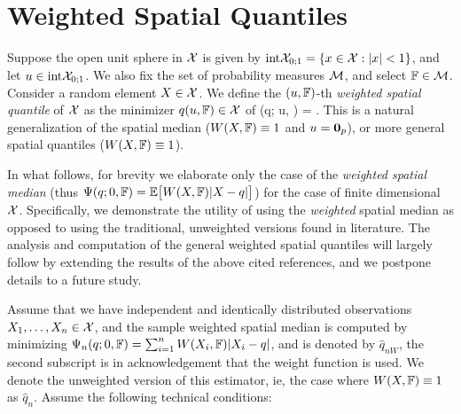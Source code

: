 \section{Weighted Spatial Quantiles}
\label{Sec:WSQuantiles}

Suppose the open unit sphere in $\mathcal{X}$ is given by 
$\textrm{int} {\mathcal{X}}_{0; 1} = \{ x \in \mathcal{X}: | x | < 1 \}$, and let
 $u \in \textrm{int} {\mathcal{X}}_{0; 1}$. We also fix the set of probability measures $\mathcal{M}$, 
 and select ${\mathbb{F}} \in \mathcal{M}$. Consider a random element $X \in \mathcal{X}$. 
We define the $(u, {\mathbb{F}})$-th \textit{weighted spatial quantile} of $\mathcal{X}$ 
as the minimizer $q (u, {\mathbb{F}}) \in \mathcal{X}$ of 
\baq
\Psi (q; u, \BF) = \BE {}.
\label{eq:WeightedQuantile}
\eaq
%
\noindent
This is a natural generalization of the spatial median \cite{ref:JASA96862_Chaudhuri, ref:Biometrika48414_Haldane,ref:AoS97435_Koltchinskii} ($W(X, {\mathbb{F}}) \equiv 1$ and $u = {\bf 0}_p$), or more general spatial quantiles \cite{ref:AoS17591_Cardotetal_Median_HilbertSpace, ref:AoS141203_ChakrabortyChaudhuri_Banach_Quantile, ref:Bernoulli152308_Minsker_Median_Banach} ($W(X, {\mathbb{F}}) \equiv 1$). 

In what follows, for brevity we elaborate only the case of the \textit{weighted spatial median} (thus $\Psi (q; 0, {\mathbb{F}}) = {\mathbb{E}} \bigl[ W (X, {\mathbb{F}}) | X - q | \bigr] $) for the case of finite dimensional $\mathcal{X}$. Specifically, we demonstrate the utility of using the {\it weighted} spatial median as opposed to using the traditional, unweighted versions found in literature. The analysis and computation of the general weighted spatial quantiles will largely follow by extending the results of the above cited references, and we postpone details to a future study.

Assume that we have independent and identically distributed observations $X_{1}, \ldots, X_{n} \in \mathcal{X}$, and the sample weighted spatial median is computed by minimizing $\Psi_{n} (q; 0, {\mathbb{F}}) = \sum_{i = 1}^{n} W (X_{i}, {\mathbb{F}}) | X_{i} - q | $, and is denoted by $\hat{q}_{nW}$, the second subscript is in acknowledgement that the weight function is used. We denote the unweighted version of this estimator, ie, the case where $W (X, {\mathbb{F}}) \equiv 1$ as $\hat{q}_{n}$. Assume the following technical conditions:

